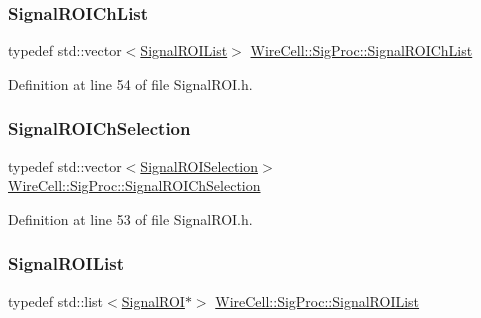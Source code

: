 \subsubsection{\texorpdfstring{Signal\+R\+O\+I\+Ch\+List}{SignalROIChList}}
{\footnotesize\ttfamily typedef std\+::vector$<$\hyperlink{namespace_wire_cell_1_1_sig_proc_a5cefcfe70fe668f822f565375f29f7d7}{Signal\+R\+O\+I\+List}$>$ \hyperlink{namespace_wire_cell_1_1_sig_proc_a5b3db127bb7fb1e16d93fa60f52905af}{Wire\+Cell\+::\+Sig\+Proc\+::\+Signal\+R\+O\+I\+Ch\+List}}



Definition at line 54 of file Signal\+R\+O\+I.\+h.

\mbox{\label{namespace_wire_cell_1_1_sig_proc_a071f04d8c720d9f75a43a29eb292a5b6}} 
\subsubsection{\texorpdfstring{Signal\+R\+O\+I\+Ch\+Selection}{SignalROIChSelection}}
{\footnotesize\ttfamily typedef std\+::vector$<$\hyperlink{namespace_wire_cell_1_1_sig_proc_a00d799ccd19bfd30953903f24d36c2a4}{Signal\+R\+O\+I\+Selection}$>$ \hyperlink{namespace_wire_cell_1_1_sig_proc_a071f04d8c720d9f75a43a29eb292a5b6}{Wire\+Cell\+::\+Sig\+Proc\+::\+Signal\+R\+O\+I\+Ch\+Selection}}



Definition at line 53 of file Signal\+R\+O\+I.\+h.

\mbox{\label{namespace_wire_cell_1_1_sig_proc_a5cefcfe70fe668f822f565375f29f7d7}} 
\subsubsection{\texorpdfstring{Signal\+R\+O\+I\+List}{SignalROIList}}
{\footnotesize\ttfamily typedef std\+::list$<$\hyperlink{class_wire_cell_1_1_sig_proc_1_1_signal_r_o_i}{Signal\+R\+OI}$\ast$$>$ \hyperlink{namespace_wire_cell_1_1_sig_proc_a5cefcfe70fe668f822f565375f29f7d7}{Wire\+Cell\+::\+Sig\+Proc\+::\+Signal\+R\+O\+I\+List}}



